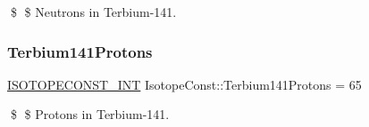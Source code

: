 \$ \$ Neutrons in Terbium-\/141. \mbox{\label{group___isotope_const-_terbium-_tb141_ga9a3c1a3585a3cd7c69512f763fd9c4d3}} 
\subsubsection{\texorpdfstring{Terbium141\+Protons}{Terbium141Protons}}
{\footnotesize\ttfamily \mbox{\hyperlink{group___isotope_const-_macros_ga5f18360b3e99483a35c32d789e62621c}{I\+S\+O\+T\+O\+P\+E\+C\+O\+N\+S\+T\+\_\+\+I\+NT}} Isotope\+Const\+::\+Terbium141\+Protons = 65}

\$ \$ Protons in Terbium-\/141. 